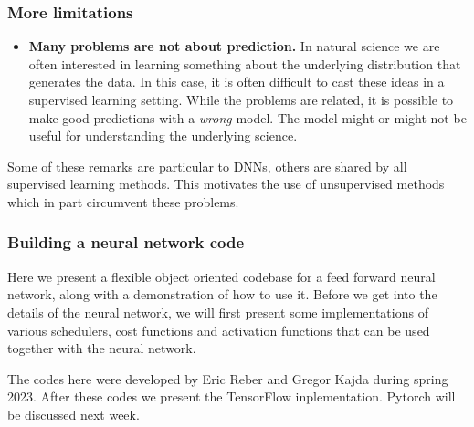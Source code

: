 \documentclass{beamer}
\begin{document}
\begin{frame}
\frametitle{More limitations}

\begin{itemize}
\item \textbf{Many problems are not about prediction.} In natural science we are often interested in learning something about the underlying distribution that generates the data. In this case, it is often difficult to cast these ideas in a supervised learning setting. While the problems are related, it is possible to make good predictions with a \emph{wrong} model. The model might or might not be useful for understanding the underlying science.
\end{itemize}

\noindent
Some of these remarks are particular to DNNs, others are shared by all supervised learning methods. This motivates the use of unsupervised methods which in part circumvent these problems.
\end{frame}

\begin{frame}
\frametitle{Building a neural network code}

Here we  present a flexible object oriented codebase
for a feed forward neural network, along with a demonstration of how
to use it. Before we get into the details of the neural network, we
will first present some implementations of various schedulers, cost
functions and activation functions that can be used together with the
neural network.

The codes here were developed by Eric Reber and Gregor Kajda during spring 2023.
After these codes we present the TensorFlow inplementation. Pytorch will be discussed next week.
\end{frame}
\end{document}
